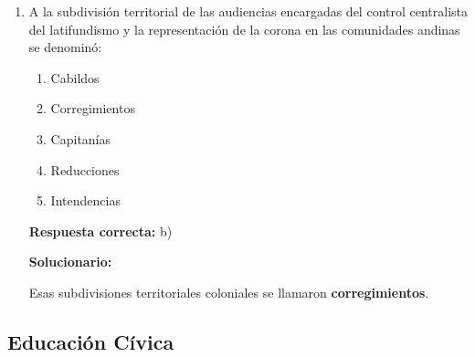 \begin{enumerate}[resume]
	\vspace{2mm}
	\textbf{Solucionario:}
	
	El yacimiento hortícola más antiguo señalado es \textbf{Guitarrero}.
	
	\vspace{6mm}
	
	\item A la subdivisión territorial de las audiencias encargadas del control centralista del latifundismo y la representación de la corona en las comunidades andinas se denominó:
	\begin{enumerate}[label=\alph*)]
		\item Cabildos
		\item Corregimientos
		\item Capitanías
		\item Reducciones
		\item Intendencias
	\end{enumerate}
	\textbf{Respuesta correcta:} b)
	
	\vspace{2mm}
	\textbf{Solucionario:}
	
	Esas subdivisiones territoriales coloniales se llamaron \textbf{corregimientos}.
	
	\vspace{6mm}
	
\end{enumerate}

\subsection*{Educación Cívica}

